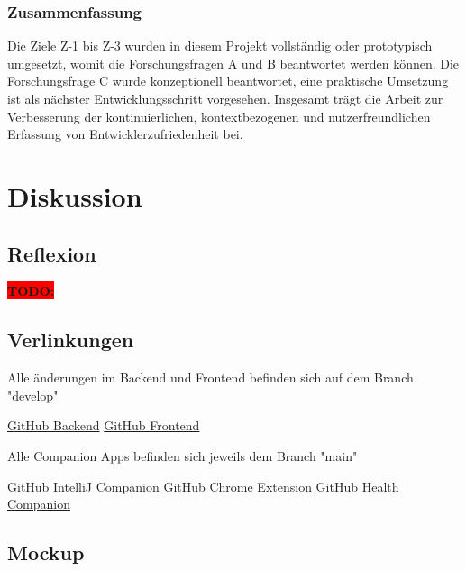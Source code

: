 \documentclass[12pt,a4paper]{report}
\newcommand{\todo}[1]{\colorbox{red}{\textbf{TODO: #1}}\\}
\begin{document}
    \subsection*{Zusammenfassung}
    Die Ziele Z-1 bis Z-3 wurden in diesem Projekt vollständig oder prototypisch umgesetzt, womit die Forschungsfragen
    A und B beantwortet werden können. Die Forschungsfrage C wurde konzeptionell beantwortet, eine praktische Umsetzung
    ist als nächster Entwicklungsschritt vorgesehen. Insgesamt trägt die Arbeit zur Verbesserung der kontinuierlichen,
    kontextbezogenen und nutzerfreundlichen Erfassung von Entwicklerzufriedenheit bei.



\chapter{Diskussion}
\section{Reflexion}
\todo{}

\printbibliography

\appendix
    \section{Verlinkungen}

        Alle änderungen im Backend und Frontend befinden sich auf dem Branch "develop"

        \href{https://github.com/fhnw-yappi/dear-dev-backend}{GitHub Backend}
        \href{https://github.com/fhnw-yappi/dear-dev-frontend}{GitHub Frontend}

        Alle Companion Apps befinden sich jeweils dem Branch "main"

        \href{https://github.com/fhnw-yappi/yappi-intellij-companion}{GitHub IntelliJ Companion}
        \href{https://github.com/fhnw-yappi/yappi-chrome-extension}{GitHub Chrome Extension}
        \href{https://github.com/fhnw-yappi/yappi-health-companion}{GitHub Health Companion}

    \section{Mockup}
\end{document}
